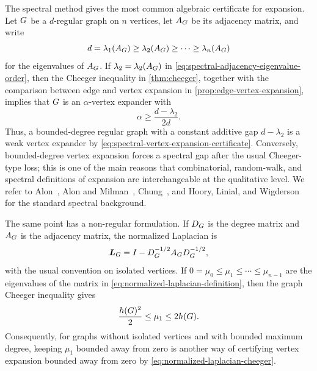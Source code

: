 \begin{example}
	\label{ex:spectral-certificates}
	The spectral method gives the most common algebraic certificate for expansion. Let \(G\) be a \(d\)-regular graph on \(n\) vertices, let \(A_{G}\) be its adjacency matrix, and write
	\begin{equation}
		\label{eq:spectral-adjacency-eigenvalue-order}
		d=\lambda_1(A_{G})\geq \lambda_2(A_{G})\geq\cdots\geq \lambda_n(A_{G})
	\end{equation}
	for the eigenvalues of \(A_{G}\). If \(\lambda_2=\lambda_2(A_{G})\) in \cref{eq:spectral-adjacency-eigenvalue-order}, then the Cheeger inequality in \cref{thm:cheeger}, together with the comparison between edge and vertex expansion in \cref{prop:edge-vertex-expansion}, implies that \(G\) is an \(\alpha\)-vertex expander with
	\begin{equation}
		\label{eq:spectral-vertex-expansion-certificate}
		\alpha\geq \frac{d-\lambda_2}{2d}.
	\end{equation}
	Thus, a bounded-degree regular graph with a constant additive gap \(d-\lambda_2\) is a weak vertex expander by \cref{eq:spectral-vertex-expansion-certificate}. Conversely, bounded-degree vertex expansion forces a spectral gap after the usual Cheeger-type loss; this is one of the main reasons that combinatorial, random-walk, and spectral definitions of expansion are interchangeable at the qualitative level. We refer to Alon~\cite{Alo1986}, Alon and Milman~\cite{AM1985}, Chung~\cite{Chu1997}, and Hoory, Linial, and Wigderson~\cite{HLW2006} for the standard spectral background.

	The same point has a non-regular formulation. If \(D_{G}\) is the degree matrix and \(A_{G}\) is the adjacency matrix, the normalized Laplacian is
	\begin{equation}
		\label{eq:normalized-laplacian-definition}
		\boldsymbol{L}_{G}=I-D_{G}^{-1/2}A_{G}D_{G}^{-1/2},
	\end{equation}
	with the usual convention on isolated vertices. If \(0=\mu_0\leq \mu_1\leq\cdots\leq \mu_{n-1}\) are the eigenvalues of the matrix in \cref{eq:normalized-laplacian-definition}, then the graph Cheeger inequality gives
	\begin{equation}
		\label{eq:normalized-laplacian-cheeger}
		\frac{h(G)^2}{2}\leq \mu_1\leq 2h(G).
	\end{equation}
	Consequently, for graphs without isolated vertices and with bounded maximum degree, keeping \(\mu_1\) bounded away from zero is another way of certifying vertex expansion bounded away from zero by \cref{eq:normalized-laplacian-cheeger}.
\end{example}

